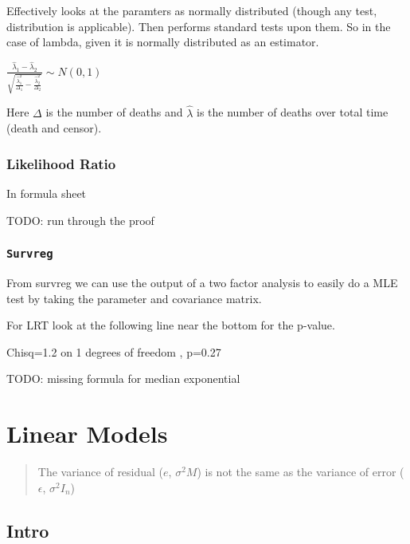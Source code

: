 \documentclass[
  letterpaper,
  DIV=11,
  numbers=noendperiod]{scrreprt}
\begin{document}
Effectively looks at the paramters as normally distributed (though any
test, distribution is applicable). Then performs standard tests upon
them. So in the case of lambda, given it is normally distributed as an
estimator.

\(\frac{\hat{\lambda}_1 - \hat{\lambda}_2}{\sqrt{\frac{\hat{\lambda}_1^2}{\Delta_1}-\frac{\hat{\lambda}_2^2}{\Delta_2}}} \sim N(0,1)\)

Here \(\Delta\) is the number of deaths and \(\hat{\lambda}\) is the
number of deaths over total time (death and censor).

\hypertarget{likelihood-ratio}{%
\subsection{Likelihood Ratio}\label{likelihood-ratio}}

In formula sheet

TODO: run through the proof

\hypertarget{survreg}{%
\subsection{\texorpdfstring{\texttt{Survreg}}{Survreg}}\label{survreg}}

From survreg we can use the output of a two factor analysis to easily do
a MLE test by taking the parameter and covariance matrix.

For LRT look at the following line near the bottom for the p-value.

Chisq=1.2 on 1 degrees of freedom , p=0.27

TODO: missing formula for median exponential


\hypertarget{linear-models}{%
\chapter{Linear Models}\label{linear-models}}

\begin{quote}
The variance of residual (\(e\), \(\sigma^2M\)) is not the same as the
variance of error (\(\epsilon\), \(\sigma^2I_n\))
\end{quote}

\hypertarget{intro}{%
\section{Intro}\label{intro}}
\end{document}
